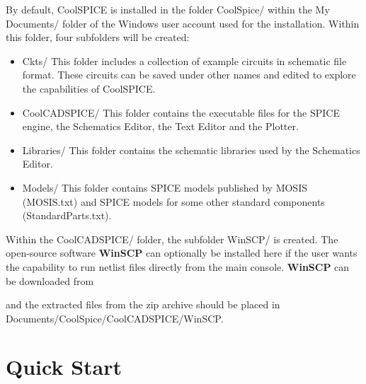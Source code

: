  By default, CoolSPICE is installed in the folder \textsf{CoolSpice/} within the \textsf{My Documents/} folder of the Windows user account used for the installation.   Within this folder, four subfolders will be created:

\begin{itemize}
\item \textsf{Ckts/}  This folder includes a collection of example circuits in schematic file format. These circuits can be saved under other names and edited to explore the capabilities of CoolSPICE.
\item \textsf{CoolCADSPICE/} This folder contains the executable files for the SPICE engine, the Schematics Editor, the Text Editor and the Plotter.
\item \textsf{Libraries/} This folder contains the schematic libraries used by the Schematics Editor.
\item \textsf{Models/} This folder contains SPICE models published by MOSIS (\textsf{MOSIS.txt}) and SPICE models for some other standard components (\textsf{StandardParts.txt}).
\end{itemize}

Within the \textsf{CoolCADSPICE/} folder, the subfolder \textsf{WinSCP/} is created. The open-source software \textbf{WinSCP} can optionally be installed here if the user wants the capability to run netlist files directly from the main console.  {\bf WinSCP} can be downloaded from
\vspace{-\parskip}
\begin{center}
\vspace{-\parskip}
\end{center}
and the extracted files from the zip archive should be placed in \\ \textsf{Documents/CoolSpice/CoolCADSPICE/WinSCP}.  

\section{Quick Start}

\label{sec_iags_quickstart} 

